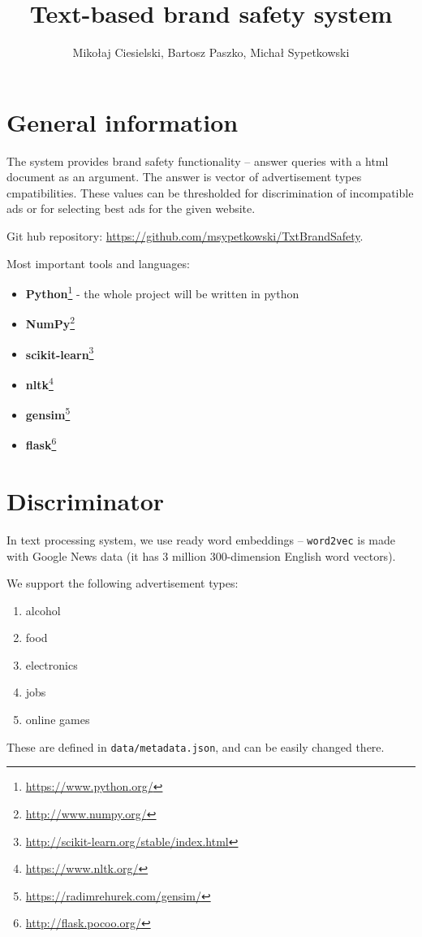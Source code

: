 \documentclass[a4paper]{article}
\begin{document}
\title{Text-based brand safety system}

\author{Mikołaj Ciesielski, Bartosz Paszko, Michał Sypetkowski}
\maketitle

\section{General information}

The system provides brand safety functionality --
answer queries with a html document as an argument.
The answer is vector of advertisement types cmpatibilities.
These values can be thresholded for discrimination of incompatible
ads or for selecting best ads for the given website.


Git hub repository: \url{https://github.com/msypetkowski/TxtBrandSafety}.

Most important tools and languages:
\begin{itemize}
    \item \textbf{Python}\footnote{\url{https://www.python.org/}}
        - the whole project will be written in python
    \item \textbf{NumPy}\footnote{\url{http://www.numpy.org/}}
    \item \textbf{scikit-learn}\footnote{\url{http://scikit-learn.org/stable/index.html}}
    \item \textbf{nltk}\footnote{\url{https://www.nltk.org/}}
    \item \textbf{gensim}\footnote{\url{https://radimrehurek.com/gensim/}}
    \item \textbf{flask}\footnote{\url{http://flask.pocoo.org/}}
\end{itemize}


\section{Discriminator}
In text processing system, we use ready word embeddings --
\texttt{word2vec} is made with Google News data (it has 3 million 300-dimension English word vectors).


We support the following advertisement types:
\begin{enumerate}
    \item alcohol
    \item food
    \item electronics
    \item jobs
    \item online games
\end{enumerate}
These are defined in \texttt{data/metadata.json}, and can be easily changed there.
\end{document}
